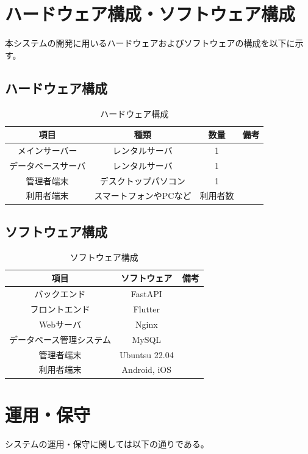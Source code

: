 \documentclass[a4paper,dvipdfmx]{jarticle}
\begin{document}
\section{ハードウェア構成・ソフトウェア構成}
本システムの開発に用いるハードウェアおよびソフトウェアの構成を以下に示す。
\subsection{ハードウェア構成}
\begin{table}[H]
    \centering
    \begin{tabular}{cccc}
        \hline
        項目        & 種類           & 数量   & 備考 \\ \hline
        メインサーバー   & レンタルサーバ      & 1    &    \\
        データベースサーバ & レンタルサーバ      & 1    &    \\
        管理者端末     & デスクトップパソコン   & 1    &    \\
        利用者端末     & スマートフォンやPCなど & 利用者数 &    \\ \hline
    \end{tabular}
    \caption{ハードウェア構成}
\end{table}
\subsection{ソフトウェア構成}
\begin{table}[H]
    \centering
    \begin{tabular}{ccc}
        \hline
        項目           & ソフトウェア        & 備考 \\ \hline
        バックエンド       & FastAPI       &    \\
        フロントエンド      & Flutter       &    \\
        Webサーバ       & Nginx         &    \\
        データベース管理システム & MySQL         &    \\
        管理者端末        & Ubuntsu 22.04 &    \\
        利用者端末        & Android, iOS  &    \\ \hline
    \end{tabular}
    \caption{ソフトウェア構成}
\end{table}
\section{運用・保守}
システムの運用・保守に関しては以下の通りである。
\end{document}
